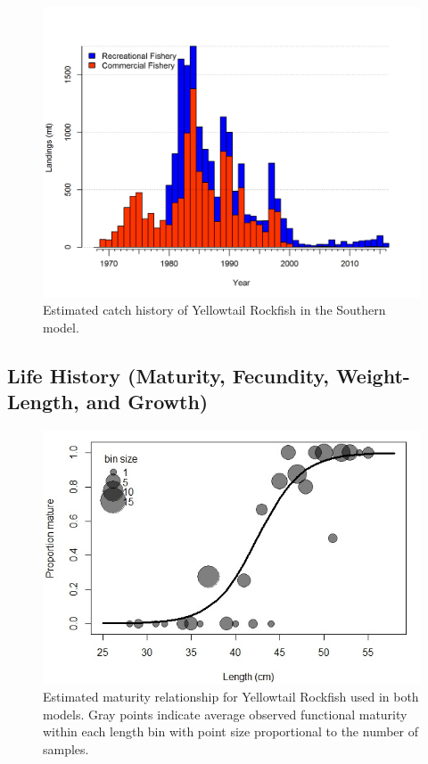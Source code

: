 \documentclass[12pt,]{article}
\begin{document}
\FloatBarrier

\begin{figure}[htbp]
\centering
\includegraphics{r4ss/plots_mod2/catch2 landings stacked.png}
\caption{Estimated catch history of Yellowtail Rockfish in the Southern
model. \label{fig:r4ss_catch2_S}}
\end{figure}

\FloatBarrier

\newpage

\subsection{Life History (Maturity, Fecundity, Weight-Length, and
Growth)}\label{life-history-maturity-fecundity-weight-length-and-growth}

\begin{figure}[htbp]
\centering
\includegraphics{Figures/YT_Propmat_update3_22.jpeg}
\caption{Estimated maturity relationship for Yellowtail Rockfish used in
both models. Gray points indicate average observed functional maturity
within each length bin with point size proportional to the number of
samples.\label{fig:maturity}}
\end{figure}
\end{document}
